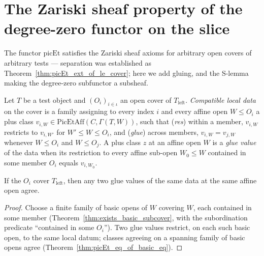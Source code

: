 \section{The Zariski sheaf property of the degree-zero functor on the slice}
\label{sec:pic0ZariskiSheaf}

The functor \(\mathrm{picEt}\) satisfies the Zariski sheaf axioms for arbitrary open covers
of arbitrary tests — separation was established as Theorem~\ref{thm:picEt_ext_of_le_cover};
here we add gluing, and the S-lemma making the degree-zero subfunctor a subsheaf.

\begin{definition}
  \label{def:picEt_LocalData}
  \leanok
  Let \(T\) be a test object and \((O_i)_{i \in \iota}\) an open cover of
  \(T_{\mathrm{left}}\). \emph{Compatible local data} on the cover is a family assigning to
  every index \(i\) and every affine open \(W \le O_i\) a plus class
  \(v_{i,W} \in \mathrm{PicEtAff}(C, \Gamma(T,W))\), such that
  (\emph{res}) within a member, \(v_{i,W}\) restricts to \(v_{i,W'}\) for \(W' \le W \le O_i\),
  and (\emph{glue}) across members, \(v_{i,W} = v_{j,W}\) whenever \(W \le O_i\) and
  \(W \le O_j\). A plus class \(z\) at an affine open \(W\) is a \emph{glue value} of the
  data when its restriction to every affine sub-open \(W_0 \le W\) contained in some member
  \(O_i\) equals \(v_{i,W_0}\).
\end{definition}

\begin{theorem}
  \label{thm:picEt_glueValue_unique}
  \leanok
  If the \(O_i\) cover \(T_{\mathrm{left}}\), then any two glue values of the same data at
  the same affine open agree.
\end{theorem}
\begin{proof}
  \leanok
  Choose a finite family of basic opens of \(W\) covering \(W\), each contained in some
  member (Theorem~\ref{thm:exists_basic_subcover}, with the subordination predicate
  ``contained in some \(O_i\)''). Two glue values restrict, on each such basic open, to the
  same local datum; classes agreeing on a spanning family of basic opens agree
  (Theorem~\ref{thm:picEt_eq_of_basic_eq}).
\end{proof}

